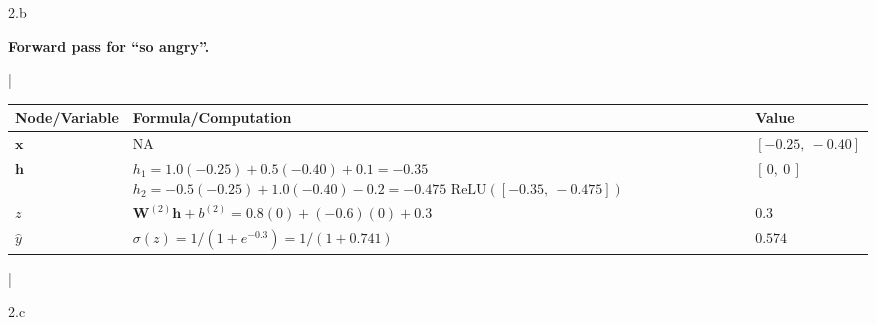 \LARGE
2.b
\normalsize

\begin{answer}
  \textbf{Forward pass for ``so angry''.}

  \medskip
  \begin{table}[H]
  \centering
  \lstDeleteShortInline|
  \begin{tabular}{|l|p{9.5cm}|l|}
  \hline
  Node/Variable & Formula/Computation & Value \\
  \hline
  $\mathbf{x}$ & NA & $[-0.25,\ -0.40]$ \\
  \hline
  $\mathbf{h}$ &
    $h_1 = 1.0(-0.25) + 0.5(-0.40) + 0.1 = -0.35$ \newline
    $h_2 = -0.5(-0.25) + 1.0(-0.40) - 0.2 = -0.475$ \newline
    $\text{ReLU}([-0.35,\ -0.475])$
    & $[\,0,\ 0\,]$ \\
  \hline
  $z$ & $\mathbf{W}^{(2)}\mathbf{h} + b^{(2)} = 0.8(0) + (-0.6)(0) + 0.3$ & $0.3$ \\
  \hline
  $\hat{y}$ & $\sigma(z) = 1/(1 + e^{-0.3}) = 1/(1 + 0.741)$ & $0.574$ \\
  \hline
  \end{tabular}
  \lstMakeShortInline|
  \end{table}
\end{answer}


\LARGE
2.c
\normalsize


